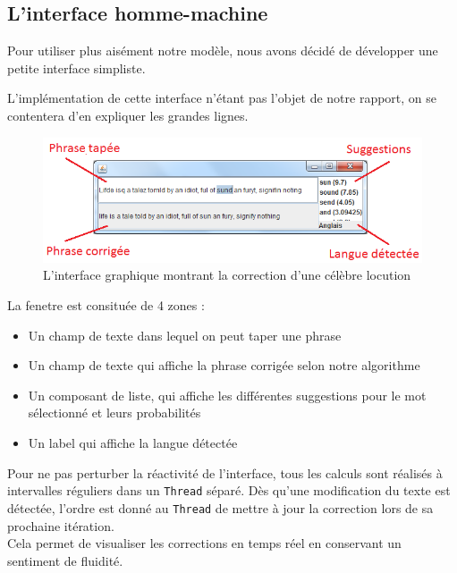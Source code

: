 \documentclass[10pt,a4paper]{article}
\begin{document}
\subsection{L'interface homme-machine}

Pour utiliser plus aisément notre modèle, nous avons décidé de développer une petite interface simpliste.

L'implémentation de cette interface n'étant pas l'objet de notre rapport, on se contentera d'en expliquer les grandes lignes.

\begin{figure}[H]
\begin{centering}
\includegraphics[scale=1.]{IHM}
\par\end{centering}
\caption{L'interface graphique montrant la correction d'une célèbre locution}
\end{figure}

La fenetre est consituée de 4 zones : \\
\begin{itemize}
\item Un champ de texte dans lequel on peut taper une phrase
\item Un champ de texte qui affiche la phrase corrigée selon notre algorithme
\item Un composant de liste, qui affiche les différentes suggestions pour le mot sélectionné et leurs probabilités
\item Un label qui affiche la langue détectée\\
\end{itemize}

Pour ne pas perturber la réactivité de l'interface, tous les calculs sont réalisés à intervalles réguliers dans un \verb!Thread! séparé. Dès qu'une modification du texte est détectée, l'ordre est donné au \verb!Thread! de mettre à jour la correction lors de sa prochaine itération.\\

Cela permet de visualiser les corrections en temps réel en conservant un sentiment de fluidité.\\
\end{document}
